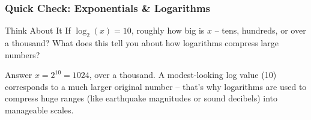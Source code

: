 \begin{frame}[fragile]\frametitle{Quick Check: Exponentials \& Logarithms}
\begin{block}{Think About It}
If $\log_2(x) = 10$, roughly how big is $x$ -- tens, hundreds, or over a thousand? What does this tell you about how logarithms compress large numbers?
\end{block}
\pause
\begin{block}{Answer}
$x = 2^{10} = 1024$, over a thousand. A modest-looking log value (10) corresponds to a much larger original number -- that's why logarithms are used to compress huge ranges (like earthquake magnitudes or sound decibels) into manageable scales.
\end{block}
\end{frame}






